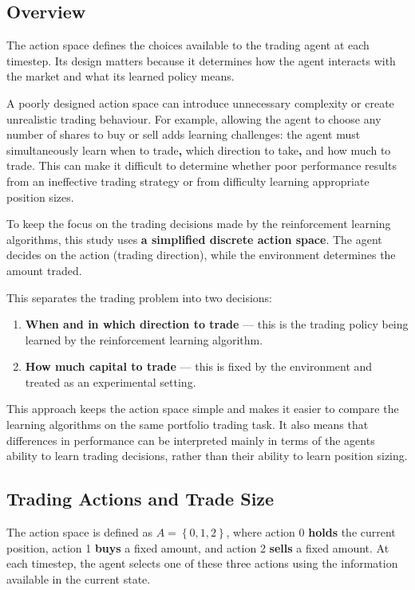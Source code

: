 \subsection{Overview}

The action space defines the choices available to the trading agent at
each timestep. Its design matters because it determines how the agent
interacts with the market and what its learned policy means.

A poorly designed action space can introduce unnecessary complexity or
create unrealistic trading behaviour. For example, allowing the agent to
choose any number of shares to buy or sell adds learning challenges: the
agent must simultaneously learn when to trade\textbf{,} which direction
to take\textbf{,} and how much to trade. This can make it difficult to
determine whether poor performance results from an ineffective trading
strategy or from difficulty learning appropriate position sizes.

To keep the focus on the trading decisions made by the reinforcement
learning algorithms, this study uses \textbf{a simplified discrete
action space}. The agent decides on the action (trading direction),
while the environment determines the amount traded.

This separates the trading problem into two decisions:

\begin{enumerate}
\def\labelenumi{\arabic{enumi}.}
\item
  \textbf{When and in which direction to trade} --- this is the trading
  policy being learned by the reinforcement learning algorithm.
\item
  \textbf{How much capital to trade} --- this is fixed by the
  environment and treated as an experimental setting.
\end{enumerate}

This approach keeps the action space simple and makes it easier to
compare the learning algorithms on the same portfolio trading task. It
also means that differences in performance can be interpreted mainly in
terms of the agents\textquotesingle{} ability to learn trading
decisions, rather than their ability to learn position sizing.

\subsection{Trading Actions and Trade Size}

The action space is defined as \(A = \left\{ 0,1,2 \right\}\), where
action 0 \textbf{holds} the current position, action 1 \textbf{buys} a
fixed amount, and action 2 \textbf{sells} a fixed amount. At each
timestep, the agent selects one of these three actions using the
information available in the current state.

